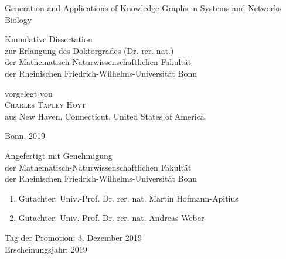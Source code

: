 \begin{titlepage} %

    \begin{center}
        \fontsize{28}{36}\selectfont %

        Generation and Applications of Knowledge Graphs in Systems and Networks Biology

        \vspace{3.5cm} %
        \renewcommand{\baselinestretch}{1.5} %
        \large

        Kumulative Dissertation \\
        zur Erlangung des Doktorgrades (Dr. rer. nat.)\\
        der Mathematisch-Naturwissenschaftlichen Fakult\"at \\
        der Rheinischen Friedrich-Wilhelms-Universit\"at Bonn \\

        \vspace{2.0cm}
        \renewcommand{\baselinestretch}{1.1}

        vorgelegt von \\
        \textsc{Charles Tapley Hoyt} \\
        aus New Haven, Connecticut, United States of America \\

        \renewcommand{\baselinestretch}{1}
        \vspace{1.0cm}

        Bonn, 2019 \\
    \end{center}
\end{titlepage}

\newpage\null\newpage

\begin{flushleft} %
    \vspace*{12cm}
    \large

    Angefertigt mit Genehmigung \\
    der Mathematisch-Naturwissenschaftlichen Fakult\"at \\
    der Rheinischen Friedrich-Wilhelms-Universit\"at Bonn \\

    \vspace{1.5cm}
    \renewcommand{\baselinestretch}{1.6}

    \begin{enumerate}
        \item Gutachter: Univ.-Prof. Dr. rer. nat. Martin Hofmann-Apitius
        \item Gutachter: Univ.-Prof. Dr. rer. nat. Andreas Weber
    \end{enumerate}
    Tag der Promotion: 3. Dezember 2019\\
    Erscheinungsjahr: 2019 \\

\end{flushleft}
\newpage\null\newpage

\setlength{\parskip}{1em} %
\renewcommand{\baselinestretch}{1.2} %






\tableofcontents
\listoffigures
\listoftables
